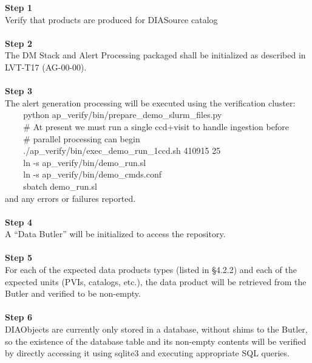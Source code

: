 \textbf{Step 1}\\
Verify that products are produced for DIASource catalog\\
~\\
\textbf{Step 2}\\
The DM Stack and Alert Processing packaged shall be initialized as
described in LVT-T17 (AG-00-00).\\
~\\
\textbf{Step 3}\\
The alert generation processing will be executed using the verification
cluster:\\
\hspace*{0.333em} ~ ~ ~python
ap\_verify/bin/prepare\_demo\_slurm\_files.py\\
\hspace*{0.333em} ~ ~ ~\# At present we must run a single ccd+visit to
handle ingestion before\\
\hspace*{0.333em} ~ ~ ~\# parallel processing can begin\\
\hspace*{0.333em} ~ ~ ~./ap\_verify/bin/exec\_demo\_run\_1ccd.sh 410915
25\\
\hspace*{0.333em} ~ ~ ~ln -s ap\_verify/bin/demo\_run.sl\\
\hspace*{0.333em} ~ ~ ~ln -s ap\_verify/bin/demo\_cmds.conf\\
\hspace*{0.333em} ~ ~ ~sbatch demo\_run.sl\\
and any errors or failures reported.\\
~\\
\textbf{Step 4}\\
A ``Data Butler'' will be initialized to access the repository.\\
~\\
\textbf{Step 5}\\
For each of the expected data products types (listed in §4.2.2) and each
of the expected units (PVIs, catalogs, etc.), the data product will be
retrieved from the Butler and verified to be non-empty.\\
~\\
\textbf{Step 6}\\
DIAObjects are currently only stored in a database, without shims to the
Butler, so the existence of the database table and its non-empty
contents will be verified by directly accessing it using sqlite3 and
executing appropriate SQL queries.\\
~\\


